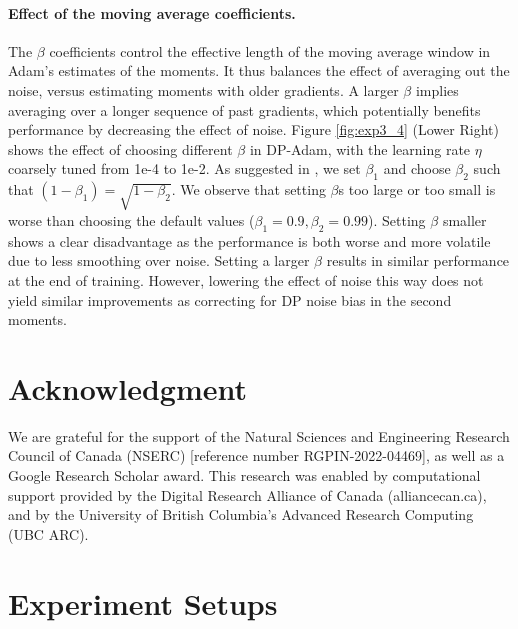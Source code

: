 \documentclass[letterpaper]{article} %
\begin{document}
\paragraph{Effect of the moving average coefficients.}
The $\beta$ coefficients control the effective length of the moving average window in Adam's estimates of the moments. It thus balances the effect of averaging out the noise, versus estimating moments with older gradients. A larger $\beta$ implies averaging over a longer sequence of past gradients, which potentially benefits performance by decreasing the effect of noise. Figure \ref{fig:exp3_4} (Lower Right) shows the effect of choosing different $\beta$ in DP-Adam, with the learning rate $\eta$ coarsely tuned from 1e-4 to 1e-2. As suggested in \citet{orig_adam}, we set $\beta_1$ and choose $\beta_2$ such that $(1-\beta_1) = \sqrt{1-\beta_2}$. We observe that setting $\beta$s too large or too small is worse than choosing the default values ($\beta_1=0.9, \beta_2=0.99$). Setting $\beta$ smaller shows a clear disadvantage as the performance is both worse and more volatile due to less smoothing over noise. Setting a larger $\beta$ results in similar performance at the end of training. However, lowering the effect of noise this way does not yield similar improvements as correcting for DP noise bias in the second moments.

\clearpage\clearpage

\section*{Acknowledgment}
We are grateful for the support of the Natural Sciences and Engineering Research Council of Canada (NSERC) [reference number RGPIN-2022-04469], as well as a Google Research Scholar award. This research was enabled by computational support provided by the Digital Research Alliance of Canada (alliancecan.ca), and by the University of British Columbia's Advanced Research Computing (UBC ARC).




\clearpage

\appendix

% 
\section{Experiment Setups}
\label{apdix:exp_setup}
\end{document}
